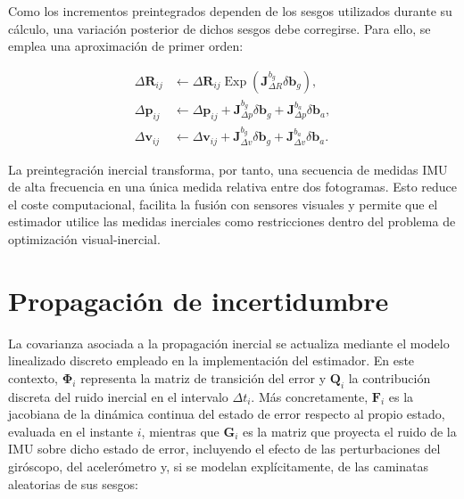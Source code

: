 Como los incrementos preintegrados dependen de los sesgos utilizados durante su cálculo, una variación posterior de dichos sesgos debe 
corregirse. Para ello, se emplea una aproximación de primer orden:

\begin{equation}
\begin{aligned}
    \Delta \mathbf{R}_{ij}
    &\leftarrow
    \Delta \mathbf{R}_{ij}
    \operatorname{Exp}
    \left(
        \mathbf{J}_{\Delta R}^{b_g}
        \delta \mathbf{b}_{g}
    \right),
    \\
    \Delta \mathbf{p}_{ij}
    &\leftarrow
    \Delta \mathbf{p}_{ij}
    +
    \mathbf{J}_{\Delta p}^{b_g}
    \delta \mathbf{b}_{g}
    +
    \mathbf{J}_{\Delta p}^{b_a}
    \delta \mathbf{b}_{a},
    \\
    \Delta \mathbf{v}_{ij}
    &\leftarrow
    \Delta \mathbf{v}_{ij}
    +
    \mathbf{J}_{\Delta v}^{b_g}
    \delta \mathbf{b}_{g}
    +
    \mathbf{J}_{\Delta v}^{b_a}
    \delta \mathbf{b}_{a}.
\end{aligned}
\end{equation}

La preintegración inercial transforma, por tanto, una secuencia de medidas IMU de alta frecuencia en una única medida relativa entre 
dos fotogramas. Esto reduce el coste computacional, facilita la fusión con sensores visuales y permite que el estimador utilice las 
medidas inerciales como restricciones dentro del problema de optimización visual-inercial.

\section{Propagación de incertidumbre}

La covarianza asociada a la propagación inercial se actualiza mediante el modelo linealizado discreto empleado en la implementación del estimador. En este contexto, \(\boldsymbol{\Phi}_i\) representa la matriz de transición del error y \(\mathbf{Q}_i\) la contribución discreta del ruido inercial en el intervalo \(\Delta t_i\). Más concretamente, \(\mathbf{F}_i\) es la jacobiana de la dinámica continua del estado de error respecto al propio estado, evaluada en el instante \(i\), mientras que \(\mathbf{G}_i\) es la matriz que proyecta el ruido de la IMU sobre dicho estado de error, incluyendo el efecto de las perturbaciones del giróscopo, del acelerómetro y, si se modelan explícitamente, de las caminatas aleatorias de sus sesgos:

